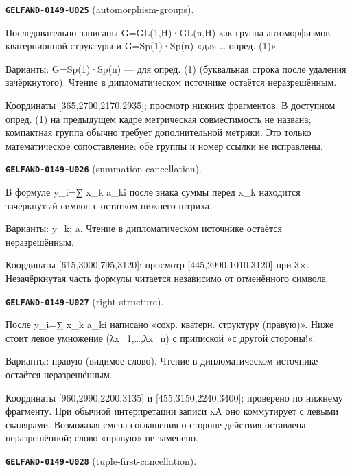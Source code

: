 \documentclass[11pt]{article}
\theoremstyle{definition}
\theoremstyle{remark}
\begin{document}
\noindent\leavevmode{}\label{GELFAND-P001372:automorphism-groups:note}\textbf{\texttt{GELFAND-0149-U025}} (automorphism-groups).\par\nopagebreak[4]
Последовательно записаны G=GL(1,H)·GL(n,H) как группа автоморфизмов кватернионной структуры и G=Sp(1)·Sp(n) «для … опред. (1)».\par
Варианты: G=Sp(1)·Sp(n) — для опред. (1) (буквальная строка после удаления зачёркнутого). Чтение в дипломатическом источнике остаётся неразрешённым.\par
Координаты [365,2700,2170,2935]; просмотр нижних фрагментов. В доступном опред. (1) на предыдущем кадре метрическая совместимость не названа; компактная группа обычно требует дополнительной метрики. Это только математическое сопоставление: обе группы и номер ссылки не исправлены.\par\medskip
\noindent\leavevmode{}\label{GELFAND-P001372:summation-cancellation:note}\textbf{\texttt{GELFAND-0149-U026}} (summation-cancellation).\par\nopagebreak[4]
В формуле y\_i=∑ x\_k a\_ki после знака суммы перед x\_k находится зачёркнутый символ с остатком нижнего штриха.\par
Варианты: y\_k; a. Чтение в дипломатическом источнике остаётся неразрешённым.\par
Координаты [615,3000,795,3120]; просмотр [445,2990,1010,3120] при 3×. Незачёркнутая часть формулы читается независимо от отменённого символа.\par\medskip
\noindent\leavevmode{}\label{GELFAND-P001372:right-structure:note}\textbf{\texttt{GELFAND-0149-U027}} (right-structure).\par\nopagebreak[4]
После y\_i=∑ x\_k a\_ki написано «сохр. кватерн. структуру (правую)». Ниже стоит левое умножение (λx\_1,…,λx\_n) с припиской «с другой стороны!».\par
Варианты: правую (видимое слово). Чтение в дипломатическом источнике остаётся неразрешённым.\par
Координаты [960,2990,2200,3135] и [455,3150,2240,3400]; проверено по нижнему фрагменту. При обычной интерпретации записи xA оно коммутирует с левыми скалярами. Возможная смена соглашения о стороне действия оставлена неразрешённой; слово «правую» не заменено.\par\medskip
\noindent\leavevmode{}\label{GELFAND-P001372:tuple-first-cancellation:note}\textbf{\texttt{GELFAND-0149-U028}} (tuple-first-cancellation).\par\nopagebreak[4]
\end{document}
